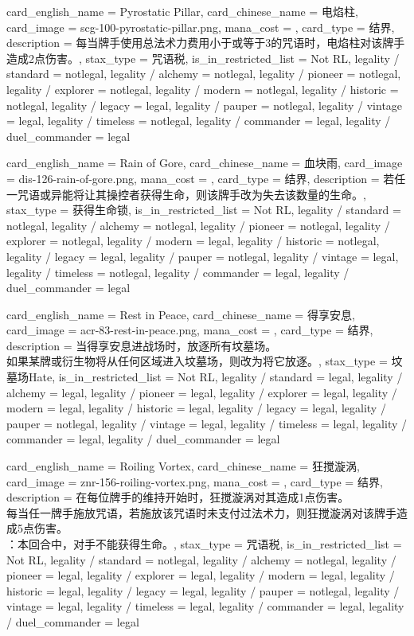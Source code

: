 \documentclass[lang = cn, color = black, 10pt]{AllThatStax}
\begin{document}
\card
{
	card_english_name = {Pyrostatic Pillar},
	card_chinese_name = {电焰柱},
	card_image = scg-100-pyrostatic-pillar.png,
	mana_cost = ,
	card_type = 结界,
	description = {每当牌手使用总法术力费用小于或等于3的咒语时，电焰柱对该牌手造成2点伤害。},
	stax_type = 咒语税,
	is_in_restricted_list = Not RL,
	legality / standard = notlegal,
	legality / alchemy = notlegal,
	legality / pioneer = notlegal,
	legality / explorer = notlegal,
	legality / modern = notlegal,
	legality / historic = notlegal,
	legality / legacy = legal,
	legality / pauper = notlegal,
	legality / vintage = legal,
	legality / timeless = notlegal,
	legality / commander = legal,
	legality / duel_commander = legal
}

\card
{
	card_english_name = {Rain of Gore},
	card_chinese_name = {血块雨},
	card_image = dis-126-rain-of-gore.png,
	mana_cost = ,
	card_type = 结界,
	description = {若任一咒语或异能将让其操控者获得生命，则该牌手改为失去该数量的生命。},
	stax_type = 获得生命锁,
	is_in_restricted_list = Not RL,
	legality / standard = notlegal,
	legality / alchemy = notlegal,
	legality / pioneer = notlegal,
	legality / explorer = notlegal,
	legality / modern = legal,
	legality / historic = notlegal,
	legality / legacy = legal,
	legality / pauper = notlegal,
	legality / vintage = legal,
	legality / timeless = notlegal,
	legality / commander = legal,
	legality / duel_commander = legal
}

\card
{
	card_english_name = {Rest in Peace},
	card_chinese_name = {得享安息},
	card_image = acr-83-rest-in-peace.png,
	mana_cost = ,
	card_type = 结界,
	description = {当得享安息进战场时，放逐所有坟墓场。\\
如果某牌或衍生物将从任何区域进入坟墓场，则改为将它放逐。},
	stax_type = 坟墓场Hate,
	is_in_restricted_list = Not RL,
	legality / standard = legal,
	legality / alchemy = legal,
	legality / pioneer = legal,
	legality / explorer = legal,
	legality / modern = legal,
	legality / historic = legal,
	legality / legacy = legal,
	legality / pauper = notlegal,
	legality / vintage = legal,
	legality / timeless = legal,
	legality / commander = legal,
	legality / duel_commander = legal
}

\card
{
	card_english_name = {Roiling Vortex},
	card_chinese_name = {狂搅漩涡},
	card_image = znr-156-roiling-vortex.png,
	mana_cost = ,
	card_type = 结界,
	description = {在每位牌手的维持开始时，狂搅漩涡对其造成1点伤害。\\
每当任一牌手施放咒语，若施放该咒语时未支付过法术力，则狂搅漩涡对该牌手造成5点伤害。\\
：本回合中，对手不能获得生命。},
	stax_type = 咒语税,
	is_in_restricted_list = Not RL,
	legality / standard = notlegal,
	legality / alchemy = notlegal,
	legality / pioneer = legal,
	legality / explorer = legal,
	legality / modern = legal,
	legality / historic = legal,
	legality / legacy = legal,
	legality / pauper = notlegal,
	legality / vintage = legal,
	legality / timeless = legal,
	legality / commander = legal,
	legality / duel_commander = legal
}
\end{document}
